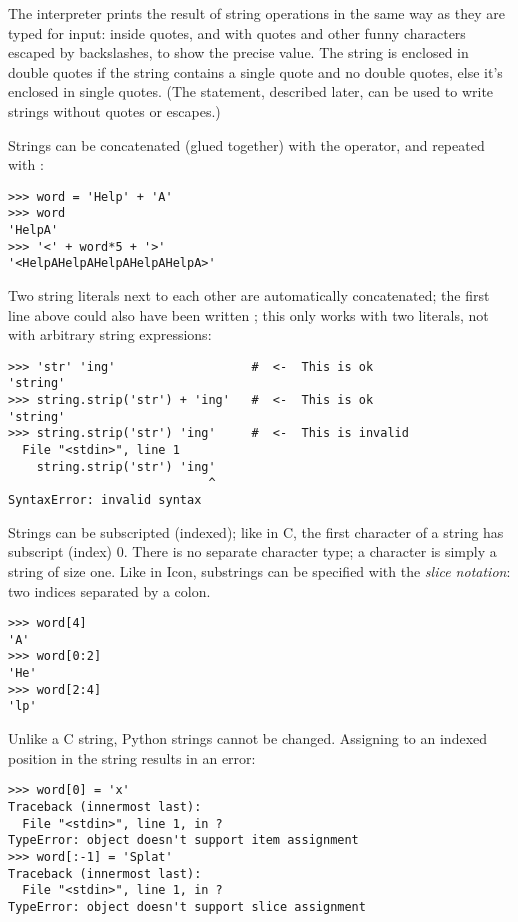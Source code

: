 \documentclass{manual}
\begin{document}
The interpreter prints the result of string operations in the same way
as they are typed for input: inside quotes, and with quotes and other
funny characters escaped by backslashes, to show the precise
value.  The string is enclosed in double quotes if the string contains
a single quote and no double quotes, else it's enclosed in single
quotes.  (The  statement, described later, can be used
to write strings without quotes or escapes.)

Strings can be concatenated (glued together) with the
\code{+} operator, and repeated with \code{*}:

\begin{verbatim}
>>> word = 'Help' + 'A'
>>> word
'HelpA'
>>> '<' + word*5 + '>'
'<HelpAHelpAHelpAHelpAHelpA>'
\end{verbatim}

Two string literals next to each other are automatically concatenated;
the first line above could also have been written ; this only works with two literals, not with arbitrary string
expressions:

\begin{verbatim}
>>> 'str' 'ing'                   #  <-  This is ok
'string'
>>> string.strip('str') + 'ing'   #  <-  This is ok
'string'
>>> string.strip('str') 'ing'     #  <-  This is invalid
  File "<stdin>", line 1
    string.strip('str') 'ing'
                            ^
SyntaxError: invalid syntax
\end{verbatim}

Strings can be subscripted (indexed); like in C, the first character
of a string has subscript (index) 0.  There is no separate character
type; a character is simply a string of size one.  Like in Icon,
substrings can be specified with the \emph{slice notation}: two indices
separated by a colon.

\begin{verbatim}
>>> word[4]
'A'
>>> word[0:2]
'He'
>>> word[2:4]
'lp'
\end{verbatim}

Unlike a C string, Python strings cannot be changed.  Assigning to an 
indexed position in the string results in an error:

\begin{verbatim}
>>> word[0] = 'x'
Traceback (innermost last):
  File "<stdin>", line 1, in ?
TypeError: object doesn't support item assignment
>>> word[:-1] = 'Splat'
Traceback (innermost last):
  File "<stdin>", line 1, in ?
TypeError: object doesn't support slice assignment
\end{verbatim}
\end{document}
